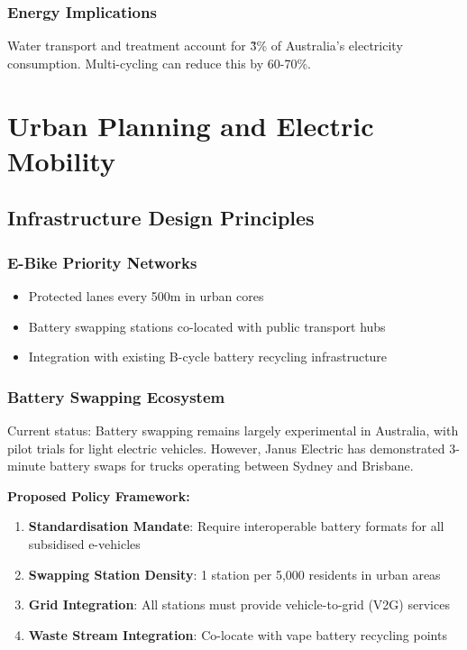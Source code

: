 \documentclass[12pt,a4paper]{article}
\begin{document}
\subsubsection{Energy Implications}
Water transport and treatment account for \~3\% of Australia's electricity consumption. Multi-cycling can reduce this by 60-70\%.

\section{Urban Planning and Electric Mobility}

\subsection{Infrastructure Design Principles}

\subsubsection{E-Bike Priority Networks}
\begin{itemize}
    \item Protected lanes every 500m in urban cores
    \item Battery swapping stations co-located with public transport hubs
    \item Integration with existing B-cycle battery recycling infrastructure
\end{itemize}

\subsubsection{Battery Swapping Ecosystem}

Current status: Battery swapping remains largely experimental in Australia, with pilot trials for light electric vehicles. However, Janus Electric has demonstrated 3-minute battery swaps for trucks operating between Sydney and Brisbane.

\textbf{Proposed Policy Framework:}
\begin{enumerate}
    \item \textbf{Standardisation Mandate}: Require interoperable battery formats for all subsidised e-vehicles
    \item \textbf{Swapping Station Density}: 1 station per 5,000 residents in urban areas
    \item \textbf{Grid Integration}: All stations must provide vehicle-to-grid (V2G) services
    \item \textbf{Waste Stream Integration}: Co-locate with vape battery recycling points
\end{enumerate}
\end{document}
